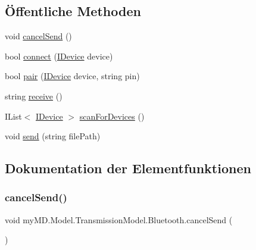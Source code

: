 \subsection*{Öffentliche Methoden}
\begin{DoxyCompactItemize}
\item 
void \mbox{\hyperlink{classmy_m_d_1_1_model_1_1_transmission_model_1_1_bluetooth_aaf2c47cc102234818e414fe362ea14a7}{cancel\+Send}} ()
\item 
bool \mbox{\hyperlink{classmy_m_d_1_1_model_1_1_transmission_model_1_1_bluetooth_add794d082480db984a9d49630d1e5bba}{connect}} (\mbox{\hyperlink{interfacemy_m_d_1_1_model_interface_1_1_transmission_model_interface_1_1_i_device}{I\+Device}} device)
\item 
bool \mbox{\hyperlink{classmy_m_d_1_1_model_1_1_transmission_model_1_1_bluetooth_a4955c9878fb425d4c20f344ecd16c2d1}{pair}} (\mbox{\hyperlink{interfacemy_m_d_1_1_model_interface_1_1_transmission_model_interface_1_1_i_device}{I\+Device}} device, string pin)
\item 
string \mbox{\hyperlink{classmy_m_d_1_1_model_1_1_transmission_model_1_1_bluetooth_aedbb2bbfe638eb5e83497c7b4e74d99d}{receive}} ()
\item 
I\+List$<$ \mbox{\hyperlink{interfacemy_m_d_1_1_model_interface_1_1_transmission_model_interface_1_1_i_device}{I\+Device}} $>$ \mbox{\hyperlink{classmy_m_d_1_1_model_1_1_transmission_model_1_1_bluetooth_a551c99750193ce8a6fc03c92864d24e8}{scan\+For\+Devices}} ()
\item 
void \mbox{\hyperlink{classmy_m_d_1_1_model_1_1_transmission_model_1_1_bluetooth_a5be7341663a848cdc5bd2209c11890ad}{send}} (string file\+Path)
\end{DoxyCompactItemize}


\subsection{Dokumentation der Elementfunktionen}
\mbox{\label{classmy_m_d_1_1_model_1_1_transmission_model_1_1_bluetooth_aaf2c47cc102234818e414fe362ea14a7}} 
\subsubsection{\texorpdfstring{cancel\+Send()}{cancelSend()}}
{\footnotesize\ttfamily void my\+M\+D.\+Model.\+Transmission\+Model.\+Bluetooth.\+cancel\+Send (\begin{DoxyParamCaption}{ }\end{DoxyParamCaption})}



